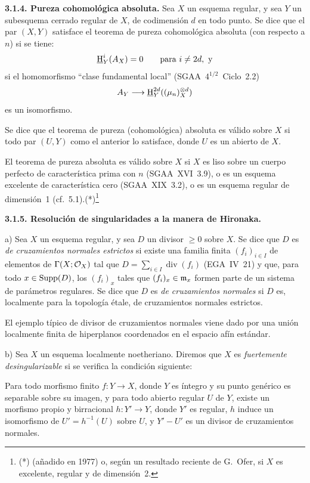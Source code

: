 \textbf{3.1.4. Pureza cohomológica absoluta.} Sea $X$ un esquema regular, y sea $Y$ un subesquema cerrado regular de $X$, de codimensión $d$ en todo punto. Se dice que el par $(X,Y)$ satisface el teorema de pureza cohomológica absoluta (con respecto a $n$) si se tiene:
\[
\underline{\mathrm{H}}^i_Y(A_X) = 0 \qquad \text{para } i \neq 2d, \text{ y}
\]
si el homomorfismo \textquotedblleft clase fundamental local\textquotedblright{} (SGAA~$4^{1/2}$~Ciclo~2.2)
\[
A_Y \longrightarrow \underline{\mathrm{H}}^{2d}_Y((\mu_n)^{\otimes d}_X)
\]
es un isomorfismo.

Se dice que el teorema de pureza (cohomológica) absoluta es válido sobre $X$ si todo par $(U,Y)$ como el anterior lo satisface, donde $U$ es un abierto de $X$.

El teorema de pureza absoluta es válido sobre $X$ si $X$ es liso sobre un cuerpo perfecto de característica prima con $n$ (SGAA~XVI~3.9), o es un esquema excelente de característica cero (SGAA~XIX~3.2), o es un esquema regular de dimensión~1 (cf.~5.1).(*)\footnote{(*) (añadido en 1977) o, según un resultado reciente de G.~Ofer, si $X$ es excelente, regular y de dimensión~2.}

\textbf{3.1.5. Resolución de singularidades a la manera de Hironaka.}

a) Sea $X$ un esquema regular, y sea $D$ un divisor $\geqslant 0$ sobre $X$. Se dice que $D$ es \emph{de cruzamientos normales estrictos} si existe una familia finita $(f_i)_{i \in I}$ de elementos de $\Gamma(X; \mathcal{O}_X)$ tal que $D = \sum_{i \in I} \operatorname{div}(f_i)$ (EGA~IV~21) y que, para todo $x \in \operatorname{Supp}(D)$, los $(f_i)_x$ tales que $(f_i)_x \in \mathfrak m_x$ formen parte de un sistema de parámetros regulares. Se dice que $D$ es \emph{de cruzamientos normales} si $D$ es, localmente para la topología étale, de cruzamientos normales estrictos.

El ejemplo típico de divisor de cruzamientos normales viene dado por una unión localmente finita de hiperplanos coordenados en el espacio afín estándar.

b) Sea $X$ un esquema localmente noetheriano. Diremos que $X$ es \emph{fuertemente desingularizable} si se verifica la condición siguiente:

Para todo morfismo finito $f : Y \to X$, donde $Y$ es íntegro y su punto genérico es separable sobre su imagen, y para todo abierto regular $U$ de $Y$, existe un morfismo propio y birracional $h : Y' \to Y$, donde $Y'$ es regular, $h$ induce un isomorfismo de $U' = h^{-1}(U)$ sobre $U$, y $Y' - U'$ es un divisor de cruzamientos normales.

